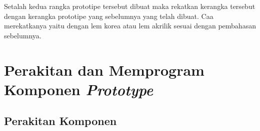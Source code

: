 \begin{enumerate}
\par Setalah kedua rangka prototipe tersebut dibuat maka rekatkan kerangka tersebut dengan kerangka prototipe yang sebelumnya yang telah dibuat. Caa merekatkanya yaitu dengan lem korea atau lem akrilik sesuai dengan pembahasan sebelumnya.

\end{enumerate}

\section{Perakitan dan Memprogram Komponen \textit{Prototype}}
\subsection{Perakitan Komponen}

